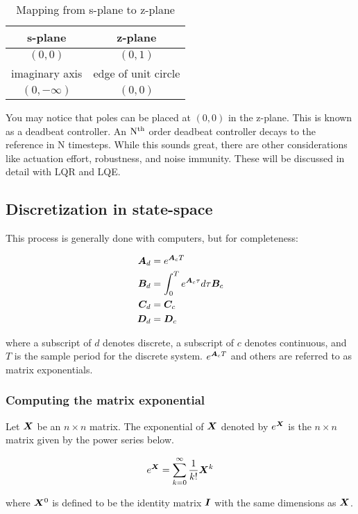 \begin{table}
  \caption{Mapping from s-plane to z-plane}
  \renewcommand{\arraystretch}{1.3}
  \centering
  \begin{tabular}{|cc|}
    \hline
    \rowcolor{lightblue}
    \textbf{s-plane} & \textbf{z-plane} \\
    \hline
    $(0, 0)$ & $(0, 1)$ \\
    imaginary axis & edge of unit circle \\
    $(0, -\infty)$ & $(0, 0)$ \\
    \hline
  \end{tabular}
  \label{tab:s-plane2z-plane}
\end{table}

You may notice that poles can be placed at $(0, 0)$ in the z-plane. This is
known as a deadbeat controller. An $\rm N^{th}$ order deadbeat controller decays
to the \gls{reference} in N timesteps. While this sounds great, there are other
considerations like actuation effort, \gls{robustness}, and
\gls{noise immunity}. These will be discussed in detail with LQR and LQE.

\subsection{Discretization in state-space}

This process is generally done with computers, but for completeness:

\begin{align}
  \bm A_d &= e^{\bm A_c T} \\
  \bm B_d &= \int_0^T e^{\bm A_c \tau} d\tau \bm B_c \\
  \bm C_d &= \bm C_c \\
  \bm D_d &= \bm D_c
\end{align}

where a subscript of $d$ denotes discrete, a subscript of $c$ denotes
continuous, and $T$ is the sample period for the discrete system.
$e^{\bm A_c T}$ and others are referred to as matrix exponentials. \\

\subsubsection{Computing the matrix exponential}

Let $\bm X$ be an $n \times n$ matrix. The exponential of $\bm X$ denoted by
$e^{\bm X}$ is the $n \times n$ matrix given by the power series below.

\begin{equation}
  e^{\bm X} = \sum_{k=0}^\infty \frac{1}{k!} \bm X^k
\end{equation}

where $\bm X^0$ is defined to be the identity matrix $\bm I$ with the same
dimensions as $\bm X$.
